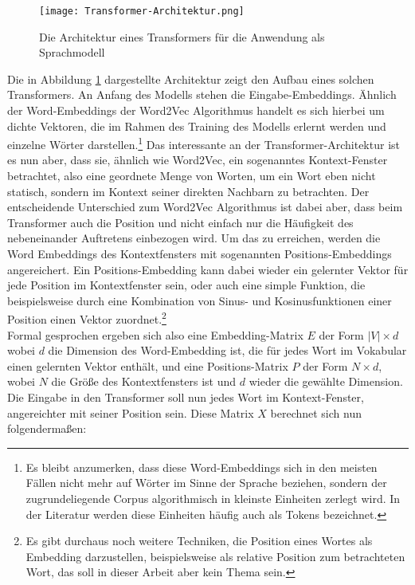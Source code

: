\begin{figure}
    \centering
    \texttt{[image: Transformer-Architektur.png]}
    \caption{Die Architektur eines Transformers für die Anwendung als Sprachmodell \parencite{jurafsky_martin_2020}}
    \label{Transformer}
\end{figure}

Die in Abbildung \ref{Transformer} dargestellte Architektur zeigt den Aufbau eines solchen Transformers. An Anfang des Modells stehen die Eingabe-Embeddings. Ähnlich der Word-Embeddings der Word2Vec Algorithmus handelt es sich hierbei um dichte Vektoren, die im Rahmen des Training des Modells erlernt werden und einzelne Wörter darstellen.\footnote{Es bleibt anzumerken, dass diese Word-Embeddings sich in den meisten Fällen nicht mehr auf Wörter im Sinne der Sprache beziehen, sondern der zugrundeliegende Corpus algorithmisch in kleinste Einheiten zerlegt wird. In der Literatur werden diese Einheiten häufig auch als Tokens bezeichnet. } Das interessante an der Transformer-Architektur ist es nun aber, dass sie, ähnlich wie Word2Vec, ein sogenanntes Kontext-Fenster betrachtet, also eine geordnete Menge von Worten, um ein Wort eben nicht statisch, sondern im Kontext seiner direkten Nachbarn zu betrachten. Der entscheidende Unterschied zum Word2Vec Algorithmus ist dabei aber, dass beim Transformer auch die Position und nicht einfach nur die Häufigkeit des nebeneinander Auftretens einbezogen wird. Um das zu erreichen, werden die Word Embeddings des Kontextfensters mit sogenannten Positions-Embeddings angereichert. Ein Positions-Embedding kann dabei wieder ein gelernter Vektor für jede Position im Kontextfenster sein, oder auch eine simple Funktion, die beispielsweise durch eine Kombination von Sinus- und Kosinusfunktionen einer Position einen Vektor zuordnet.\footnote{Es gibt durchaus noch weitere Techniken, die Position eines Wortes als Embedding darzustellen, beispielsweise als relative Position zum betrachteten Wort, das soll in dieser Arbeit aber kein Thema sein. } \\

Formal gesprochen ergeben sich also eine Embedding-Matrix $E$ der Form $|V| \times d$ wobei $d$ die Dimension des Word-Embedding ist, die für jedes Wort im Vokabular einen gelernten Vektor enthält, und eine Positions-Matrix $P$ der Form $N \times d$, wobei $N$ die Größe des Kontextfensters ist und $d$ wieder die gewählte Dimension. Die Eingabe in den Transformer soll nun jedes Wort im Kontext-Fenster, angereichter mit seiner Position sein. Diese Matrix $X$ berechnet sich nun folgendermaßen:

